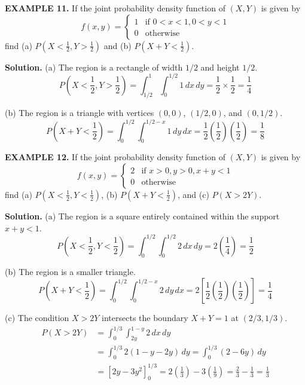 \documentclass{article}
\begin{document}
\vspace{1em}

\textbf{EXAMPLE 11.} If the joint probability density function of $(X,Y)$ is given by
$$
f(x, y) = \begin{cases} 1 & \text{if } 0 < x < 1, 0 < y < 1 \\ 0 & \text{otherwise} \end{cases}
$$
find (a) $P(X < \frac{1}{2}, Y > \frac{1}{2})$ and (b) $P(X +Y < \frac{1}{2})$.

\textbf{Solution.}
(a) The region is a rectangle of width $1/2$ and height $1/2$.
$$P\left(X < \frac{1}{2}, Y > \frac{1}{2}\right) = \int_{1/2}^{1} \int_{0}^{1/2} 1 \,dx \,dy = \frac{1}{2} \times \frac{1}{2} = \frac{1}{4}$$

(b) The region is a triangle with vertices $(0,0)$, $(1/2,0)$, and $(0,1/2)$.
$$P\left(X +Y < \frac{1}{2}\right) = \int_{0}^{1/2} \int_{0}^{1/2-x} 1 \,dy \,dx = \frac{1}{2} \left(\frac{1}{2}\right) \left(\frac{1}{2}\right) = \frac{1}{8}$$

\vspace{1em}

\textbf{EXAMPLE 12.} If the joint probability density function of $(X,Y)$ is given by
$$
f(x,y) = \begin{cases} 2 & \text{if } x > 0, y > 0, x+y < 1 \\ 0 & \text{otherwise} \end{cases}
$$
find (a) $P(X < \frac{1}{2}, Y < \frac{1}{2})$, (b) $P(X +Y < \frac{1}{2})$, and (c) $P(X > 2Y)$.

\textbf{Solution.}
(a) The region is a square entirely contained within the support $x+y < 1$.
$$P\left(X < \frac{1}{2}, Y < \frac{1}{2}\right) = \int_{0}^{1/2} \int_{0}^{1/2} 2 \,dx \,dy = 2 \left(\frac{1}{4}\right) = \frac{1}{2}$$

(b) The region is a smaller triangle.
$$P\left(X +Y < \frac{1}{2}\right) = \int_{0}^{1/2} \int_{0}^{1/2-x} 2 \,dy \,dx = 2 \left[ \frac{1}{2} \left(\frac{1}{2}\right) \left(\frac{1}{2}\right) \right] = \frac{1}{4}$$

(c) The condition $X > 2Y$ intersects the boundary $X+Y=1$ at $(2/3, 1/3)$.
\begin{align*}
P(X > 2Y) &= \int_{0}^{1/3} \int_{2y}^{1-y} 2 \,dx \,dy \\
&= \int_{0}^{1/3} 2(1 - y - 2y) \,dy = \int_{0}^{1/3} (2 - 6y) \,dy \\
&= \left[ 2y - 3y^2 \right]_{0}^{1/3} = 2\left(\frac{1}{3}\right) - 3\left(\frac{1}{9}\right) = \frac{2}{3} - \frac{1}{3} = \frac{1}{3}
\end{align*}
\end{document}

